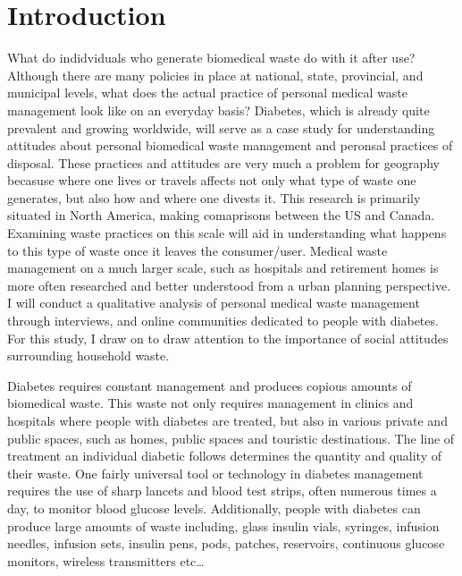 \documentclass[12pt]{article}
\begin{document}
\section{Introduction}
\doublespacing
What do indidviduals who generate biomedical waste do with it after use? Although there are many policies in place at national, state, provincial, and municipal levels, what does the actual practice of personal medical waste management look like on an everyday basis? Diabetes, which is already quite prevalent and growing worldwide, will serve as a case study for understanding attitudes about personal biomedical waste management and peronsal practices of disposal. These practices and attitudes are very much a problem for geography becasuse where one lives or travels affects not only what type of waste one generates, but also how and where one divests it. This research is primarily situated in North America, making comaprisons between the US and Canada. Examining waste practices on this scale will aid in understanding what happens to this type of waste once it leaves the consumer/user. Medical waste management on a much larger scale, such as hospitals and retirement homes is more often researched and better understood from a urban planning perspective. I will conduct a qualitative analysis of personal medical waste management through interviews, and online communities dedicated to people with diabetes. For this study, I draw on \citet{barr_household_2002} to draw attention to the importance of social attitudes surrounding household waste.

Diabetes requires constant management and produces copious amounts of biomedical waste. This waste not only requires management in clinics and hospitals where people with diabetes are treated, but also in various private and public spaces, such as homes, public spaces and touristic destinations. The line of treatment an individual diabetic follows determines the quantity and quality of their waste. One fairly universal tool or technology in diabetes management requires the use of sharp lancets and blood test strips, often numerous times a day, to monitor blood glucose levels. Additionally, people with diabetes can produce large amounts of waste including, glass insulin vials, syringes, infusion needles, infusion sets, insulin pens, pods, patches, reservoirs, continuous glucose monitors, wireless transmitters etc… 
\end{document}
